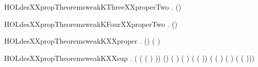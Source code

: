 \newcommand{\HOLdesXXpropTheoremsweakKTwoXXproperTwo}{\UseVerbatim{HOLdesXXpropTheoremsweakKTwoXXproperTwo}}
\begin{SaveVerbatim}{HOLdesXXpropTheoremsweakKThreeXXproperTwo}
\HOLTokenTurnstile{} \HOLSymConst{\HOLTokenForall{}}.  \HOLConst{\HOLTokenIn{}}  \HOLSymConst{\HOLTokenConj{}}   \HOLSymConst{=} (\HOLSymConst{,}) \HOLSymConst{\HOLTokenImp{}}
         \HOLSymConst{=} 
\end{SaveVerbatim}
\newcommand{\HOLdesXXpropTheoremsweakKThreeXXproperTwo}{\UseVerbatim{HOLdesXXpropTheoremsweakKThreeXXproperTwo}}
\begin{SaveVerbatim}{HOLdesXXpropTheoremsweakKFourXXproperTwo}
\HOLTokenTurnstile{} \HOLSymConst{\HOLTokenForall{}}.  \HOLConst{\HOLTokenIn{}}  \HOLSymConst{\HOLTokenConj{}}   \HOLSymConst{=} (\HOLSymConst{,}) \HOLSymConst{\HOLTokenImp{}}
         \HOLSymConst{=} 
\end{SaveVerbatim}
\newcommand{\HOLdesXXpropTheoremsweakKFourXXproperTwo}{\UseVerbatim{HOLdesXXpropTheoremsweakKFourXXproperTwo}}
\begin{SaveVerbatim}{HOLdesXXpropTheoremsweakKXXproper}
\HOLTokenTurnstile{} \HOLSymConst{\HOLTokenForall{}} .
        \HOLSymConst{\HOLTokenConj{}}   \HOLSymConst{=} (\HOLSymConst{,}) \HOLSymConst{\HOLTokenImp{}}
      ( ) \HOLSymConst{=} 
\end{SaveVerbatim}
\newcommand{\HOLdesXXpropTheoremsweakKXXproper}{\UseVerbatim{HOLdesXXpropTheoremsweakKXXproper}}
\begin{SaveVerbatim}{HOLdesXXpropTheoremsweakKXXsup}
\HOLTokenTurnstile{} \HOLSymConst{\HOLTokenForall{}} .
        \HOLSymConst{\HOLTokenConj{}}  \HOLSymConst{\HOLTokenLeq{}}  \HOLSymConst{\HOLTokenConj{}}  \HOLSymConst{\HOLTokenLeq{}}  \HOLSymConst{\HOLTokenConj{}}
      ( (  (  ) )) \HOLSymConst{=} (\HOLSymConst{,}) \HOLSymConst{\HOLTokenImp{}}
      ( \HOLSymConst{\ensuremath{-}} ) (  ) ( ( )) \HOLSymConst{=}
      ( ( \HOLSymConst{\ensuremath{+}} ) (  ) ( ( )))
\end{SaveVerbatim}
